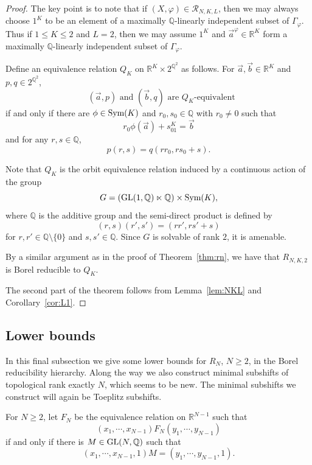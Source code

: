 \documentclass{amsart}
\theoremstyle{definition}
\theoremstyle{problem}
\theoremstyle{remark}
\numberwithin{equation}{section}
\begin{document}
\begin{proof} The key point is to note that if $(X, \varphi)\in \mathcal{R}_{N,K, L}$, then we may always choose $1^K$ to be an element of a maximally $\mathbb{Q}$-linearly independent subset of $\Gamma_\varphi$. Thus if $1\leq K\leq 2$ and $L=2$, then we may assume $1^K$ and $\vec{a}^\varphi\in \mathbb{R}^K$ form a maximally $\mathbb{Q}$-linearly independent subset of $\Gamma_\varphi$. 

Define an equivalence relation $Q_K$ on $\mathbb{R}^K\times 2^{\mathbb{Q}^2}$ as follows. For $\vec{a}, \vec{b}\in \mathbb{R}^K$ and $p,q\in 2^{\mathbb{Q}^2}$, 
$$ \mbox{ $(\vec{a}, p)$ and $(\vec{b}, q)$ are $Q_K$-equivalent} $$
if and only if there are $\phi\in\mbox{\rm Sym}(K)$ and $r_0, s_0\in \mathbb{Q}$ with $r_0\neq 0$ such that
$$ r_0\phi(\vec{a})+s_01^K=\vec{b} $$
and for any $r, s\in \mathbb{Q}$,
$$ p(r, s)=q(rr_0, rs_0+s). $$

Note that $Q_K$ is the orbit equivalence relation induced by a continuous action of the group
$$ G=(\mbox{\rm GL}(1, \mathbb{Q})\ltimes \mathbb{Q})\times \mbox{\rm Sym}(K), $$
where $\mathbb{Q}$ is the additive group and the semi-direct product is defined by
$$ (r, s)(r',s')=(rr', rs'+s) $$
for $r,r'\in\mathbb{Q}\setminus\{0\}$ and $s, s'\in\mathbb{Q}$. Since $G$ is solvable of rank $2$, it is amenable. 

By a similar argument as in the proof of Theorem~\ref{thm:rn}, we have that $R_{N, K, 2}$ is Borel reducible to $Q_K$. 

The second part of the theorem follows from Lemma~\ref{lem:NKL} and Corollary~\ref{cor:L1}.
\end{proof}















\subsection{Lower bounds}
In this final subsection we give some lower bounds for $R_N$, $N\geq 2$, in the Borel reducibility hierarchy. Along the way we also construct minimal subshifts of topological rank exactly $N$, which seems to be new. The minimal subshifts we construct will again be Toeplitz subshifts.

For $N\ge2$, let $F_N$ be the equivalence relation on $\mathbb{R}^{N-1}$ such that $$(x_1,\cdots,x_{N-1})F_N (y_1,\cdots,y_{N-1})$$ if and only if there is $M\in \mbox{\rm GL}(N,\mathbb{Q})$ such that
$$(x_1,\cdots,x_{N-1},1)M=(y_1,\cdots,y_{N-1},1). $$
\end{document}
